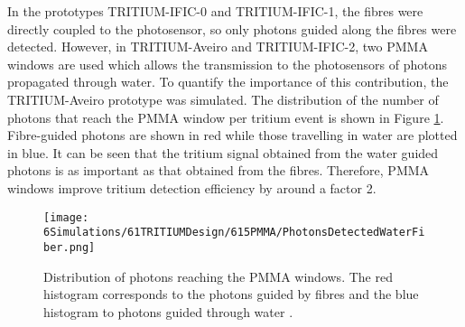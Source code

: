 In the prototypes TRITIUM-IFIC-0 and TRITIUM-IFIC-1, the fibres were directly coupled to the photosensor, so only photons guided along the fibres were detected. However, in TRITIUM-Aveiro and TRITIUM-IFIC-2, two PMMA windows are used which allows the transmission to the photosensors of photons propagated through water. To quantify the importance of this contribution, the TRITIUM-Aveiro prototype was simulated. The distribution of the number of photons that reach the PMMA window per tritium event is shown in Figure \ref{fig:PMMAEffect}. Fibre-guided photons are shown in red while those travelling in water are plotted in blue. It can be seen that the tritium signal obtained from the water guided photons is as important as that obtained from the fibres. Therefore, PMMA windows improve tritium detection efficiency by around a factor 2.

\begin{figure}[t]
\centering
\texttt{[image: 6Simulations/61TRITIUMDesign/615PMMA/PhotonsDetectedWaterFiber.png]}
\caption{Distribution of photons reaching the PMMA windows. The red histogram corresponds to the photons guided by fibres and the blue histogram to photons guided through water \cite{SimulationPaperCarlos}.\label{fig:PMMAEffect}}
\end{figure}


